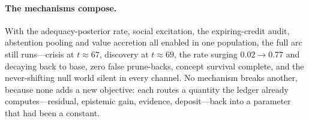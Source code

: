 \documentclass[runningheads]{llncs}
\begin{document}
\paragraph{The mechanisms compose.}
With the adequacy-posterior rate, social excitation, the expiring-credit audit, abstention
pooling and value accretion all enabled in one population, the full arc still runs---crisis at
$t\approx67$, discovery at $t\approx69$, the rate surging $0.02\to0.77$ and decaying back to
base, zero false prune-backs, concept survival complete, and the never-shifting null world silent
in every channel. No mechanism breaks another, because none adds a new objective: each routes a
quantity the ledger already computes---residual, epistemic gain, evidence, deposit---back into a
parameter that had been a constant.
\end{document}
